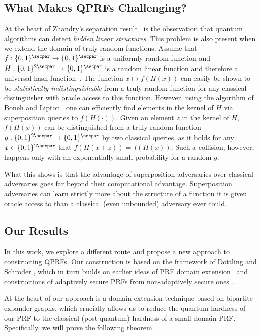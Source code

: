 \subsection{What Makes QPRFs Challenging?}\label{sec:challenge}

At the heart of Zhandry's separation result~\cite{FOCS:Zhandry12} is the observation that quantum algorithms can detect \emph{hidden linear structures}. This problem is also present when we extend the domain of truly random functions. Assume that $f: \{0,1\}^\secpar \rightarrow \{0,1\}^\secpar$ is a uniformly random function and $H: \{0,1\}^{2 \secpar} \rightarrow \{0,1\}^\secpar$ is a random linear function and therefore a universal hash function~\cite{CW77}. The function $x \mapsto f(H(x))$ can easily be shown to be \emph{statistically indistinguishable} from a truly random function for any classical distinguisher with oracle access to this function. However, using the algorithm of Boneh and Lipton~\cite{C:BonLip95} one can efficiently find elements in the kernel of $H$ via superposition queries to $f(H(\cdot))$. Given an element $z$ in the kernel of $H$, $f(H(x))$ can be distinguished from a truly random function $g: \{0,1\}^{2\secpar} \rightarrow \{0,1\}^\secpar$ by two classical queries, as it holds for any $x \in \{0,1\}^{2\secpar}$ that $f(H(x + z)) = f(H(x))$. Such a collision, however, happens only with an exponentially small probability for a random $g$.

What this shows is that the advantage of superposition adversaries over classical adversaries goes far beyond their computational advantage. Superposition adversaries can learn strictly more about the structure of a function it is given oracle access to than a classical (even unbounded) adversary ever could.
\subsection{Our Results}

In this work, we explore a different route and propose a new approach to constructing QPRFs. Our construction is based on the framework of D{\"o}ttling and Schr{\"o}der \cite{C:DotSch15}, which in turn builds on earlier ideas of PRF domain extension~\cite{TCC:JaiPieTen12,TCC:BHKN13} and constructions of adaptively secure PRFs from non-adaptively secure ones~\cite{TCC:BerHai12}.

At the heart of our approach is a domain extension technique based on bipartite expander graphs, which crucially allows us to reduce the quantum hardness of our PRF to the classical (post-quantum) hardness of a small-domain PRF. Specifically, we will prove the following theorem.

